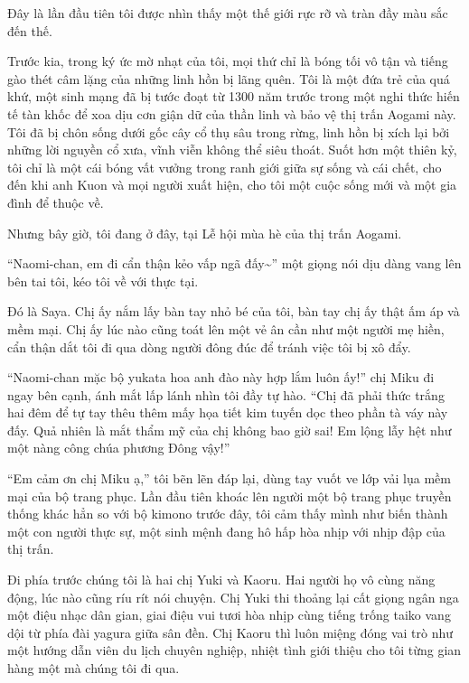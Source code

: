 \documentclass[../main.tex]{subfiles}
\begin{document}

Đây là lần đầu tiên tôi được nhìn thấy một thế giới rực rỡ và tràn đầy màu sắc đến thế.

Trước kia, trong ký ức mờ nhạt của tôi, mọi thứ chỉ là bóng tối vô tận và tiếng gào thét câm lặng của những linh hồn bị lãng quên. Tôi là một đứa trẻ của quá khứ, một sinh mạng đã bị tước đoạt từ 1300 năm trước trong một nghi thức hiến tế tàn khốc để xoa dịu cơn giận dữ của thần linh và bảo vệ thị trấn Aogami này. Tôi đã bị chôn sống dưới gốc cây cổ thụ sâu trong rừng, linh hồn bị xích lại bởi những lời nguyền cổ xưa, vĩnh viễn không thể siêu thoát. Suốt hơn một thiên kỷ, tôi chỉ là một cái bóng vất vưởng trong ranh giới giữa sự sống và cái chết, cho đến khi anh Kuon và mọi người xuất hiện, cho tôi một cuộc sống mới và một gia đình để thuộc về.

Nhưng bây giờ, tôi đang ở đây, tại Lễ hội mùa hè của thị trấn Aogami.

``Naomi-chan, em đi cẩn thận kẻo vấp ngã đấy\~{}'' một giọng nói dịu dàng vang lên bên tai tôi, kéo tôi về với thực tại.

Đó là Saya. Chị ấy nắm lấy bàn tay nhỏ bé của tôi, bàn tay chị ấy thật ấm áp và mềm mại. Chị ấy lúc nào cũng toát lên một vẻ ân cần như một người mẹ hiền, cẩn thận dắt tôi đi qua dòng người đông đúc để tránh việc tôi bị xô đẩy.

``Naomi-chan mặc bộ yukata hoa anh đào này hợp lắm luôn ấy!'' chị Miku đi ngay bên cạnh, ánh mắt lấp lánh nhìn tôi đầy tự hào. ``Chị đã phải thức trắng hai đêm để tự tay thêu thêm mấy họa tiết kim tuyến dọc theo phần tà váy này đấy. Quả nhiên là mắt thẩm mỹ của chị không bao giờ sai! Em lộng lẫy hệt như một nàng công chúa phương Đông vậy!''

``Em cảm ơn chị Miku ạ,'' tôi bẽn lẽn đáp lại, dùng tay vuốt ve lớp vải lụa mềm mại của bộ trang phục. Lần đầu tiên khoác lên người một bộ trang phục truyền thống khác hẳn so với bộ kimono trước đây, tôi cảm thấy mình như biến thành một con người thực sự, một sinh mệnh đang hô hấp hòa nhịp với nhịp đập của thị trấn.

Đi phía trước chúng tôi là hai chị Yuki và Kaoru. Hai người họ vô cùng năng động, lúc nào cũng ríu rít nói chuyện. Chị Yuki thi thoảng lại cất giọng ngân nga một điệu nhạc dân gian, giai điệu vui tươi hòa nhịp cùng tiếng trống taiko vang dội từ phía đài yagura giữa sân đền. Chị Kaoru thì luôn miệng đóng vai trò như một hướng dẫn viên du lịch chuyên nghiệp, nhiệt tình giới thiệu cho tôi từng gian hàng một mà chúng tôi đi qua.
\end{document}
